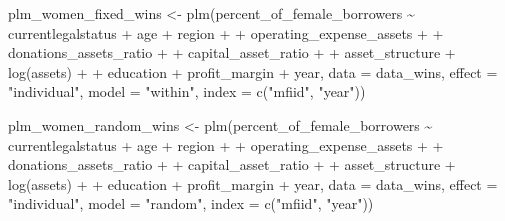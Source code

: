 \documentclass[a4paper,nobind]{templates/ociamthesis}
\newenvironment{Shaded}{\begin{snugshade}}{\end{snugshade}}
\newcommand{\AttributeTok}[1]{\textcolor[rgb]{0.77,0.63,0.00}{#1}}
\newcommand{\FunctionTok}[1]{\textcolor[rgb]{0.00,0.00,0.00}{#1}}
\newcommand{\NormalTok}[1]{#1}
\newcommand{\OtherTok}[1]{\textcolor[rgb]{0.56,0.35,0.01}{#1}}
\newcommand{\SpecialCharTok}[1]{\textcolor[rgb]{0.00,0.00,0.00}{#1}}
\newcommand{\StringTok}[1]{\textcolor[rgb]{0.31,0.60,0.02}{#1}}
\renewenvironment{Shaded}
{
  \vspace{10pt}%
  \begin{snugshade}%
}{%
  \end{snugshade}%
  \vspace{8pt}%
}
\begin{document}
\begin{landscape}
\begin{Shaded}
\begin{Highlighting}[]
\NormalTok{plm\_women\_fixed\_wins }\OtherTok{\textless{}{-}} \FunctionTok{plm}\NormalTok{(percent\_of\_female\_borrowers }\SpecialCharTok{\textasciitilde{}}\NormalTok{ currentlegalstatus }\SpecialCharTok{+}\NormalTok{ age }\SpecialCharTok{+}\NormalTok{ region }\SpecialCharTok{+}
\SpecialCharTok{+}\NormalTok{           operating\_expense\_assets }\SpecialCharTok{+} 
\SpecialCharTok{+}\NormalTok{           donations\_assets\_ratio }\SpecialCharTok{+} 
\SpecialCharTok{+}\NormalTok{           capital\_asset\_ratio }\SpecialCharTok{+}
\SpecialCharTok{+}\NormalTok{           asset\_structure }\SpecialCharTok{+} \FunctionTok{log}\NormalTok{(assets) }\SpecialCharTok{+} 
\SpecialCharTok{+}\NormalTok{           education }\SpecialCharTok{+}\NormalTok{ profit\_margin }\SpecialCharTok{+}\NormalTok{ year, }
               \AttributeTok{data =}\NormalTok{ data\_wins, }\AttributeTok{effect =} \StringTok{"individual"}\NormalTok{, }\AttributeTok{model =} \StringTok{"within"}\NormalTok{, }
      \AttributeTok{index =} \FunctionTok{c}\NormalTok{(}\StringTok{"mfiid"}\NormalTok{, }\StringTok{"year"}\NormalTok{))}

\NormalTok{plm\_women\_random\_wins }\OtherTok{\textless{}{-}} \FunctionTok{plm}\NormalTok{(percent\_of\_female\_borrowers }\SpecialCharTok{\textasciitilde{}}\NormalTok{ currentlegalstatus }\SpecialCharTok{+}\NormalTok{ age }\SpecialCharTok{+}\NormalTok{ region }\SpecialCharTok{+}
\SpecialCharTok{+}\NormalTok{           operating\_expense\_assets }\SpecialCharTok{+} 
\SpecialCharTok{+}\NormalTok{           donations\_assets\_ratio }\SpecialCharTok{+} 
\SpecialCharTok{+}\NormalTok{           capital\_asset\_ratio }\SpecialCharTok{+}
\SpecialCharTok{+}\NormalTok{           asset\_structure }\SpecialCharTok{+} \FunctionTok{log}\NormalTok{(assets) }\SpecialCharTok{+} 
\SpecialCharTok{+}\NormalTok{           education }\SpecialCharTok{+}\NormalTok{ profit\_margin }\SpecialCharTok{+}\NormalTok{ year, }
               \AttributeTok{data =}\NormalTok{ data\_wins, }\AttributeTok{effect =} \StringTok{"individual"}\NormalTok{, }\AttributeTok{model =} \StringTok{"random"}\NormalTok{, }
      \AttributeTok{index =} \FunctionTok{c}\NormalTok{(}\StringTok{"mfiid"}\NormalTok{, }\StringTok{"year"}\NormalTok{))}


\end{Highlighting}
\end{Shaded}
\end{landscape}
\end{document}

